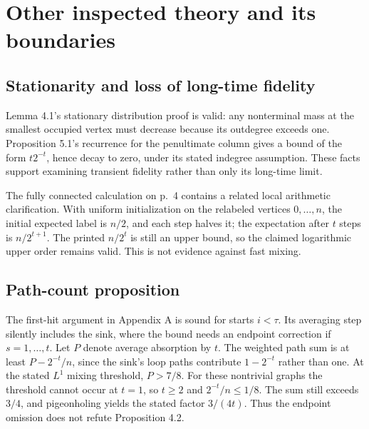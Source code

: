 \documentclass[10pt]{article}
\begin{document}
\section*{Other inspected theory and its boundaries}
\subsection*{Stationarity and loss of long-time fidelity}
Lemma 4.1’s stationary distribution proof is valid: any nonterminal mass at the smallest occupied vertex must decrease because its outdegree exceeds one. Proposition 5.1’s recurrence for the penultimate column gives a bound of the form \(t2^{-t}\), hence decay to zero, under its stated indegree assumption. These facts support examining transient fidelity rather than only its long-time limit.\par
The fully connected calculation on p. 4 contains a related local arithmetic clarification. With uniform initialization on the relabeled vertices \(0,\ldots,n\), the initial expected label is \(n/2\), and each step halves it; the expectation after \(t\) steps is \(n/2^{t+1}\). The printed \(n/2^t\) is still an upper bound, so the claimed logarithmic upper order remains valid. This is not evidence against fast mixing.\par
\subsection*{Path-count proposition}
The first-hit argument in Appendix A is sound for starts \(i<\tau\). Its averaging step silently includes the sink, where the bound needs an endpoint correction if \(s=1,\ldots,t\). Let \(P\) denote average absorption by \(t\). The weighted path sum is at least \(P-2^{-t}/n\), since the sink’s loop paths contribute \(1-2^{-t}\) rather than one. At the stated \(L^1\) mixing threshold, \(P>7/8\). For these nontrivial graphs the threshold cannot occur at \(t=1\), so \(t\ge2\) and \(2^{-t}/n\le1/8\). The sum still exceeds \(3/4\), and pigeonholing yields the stated factor \(3/(4t)\). Thus the endpoint omission does not refute Proposition 4.2.\par
\end{document}
